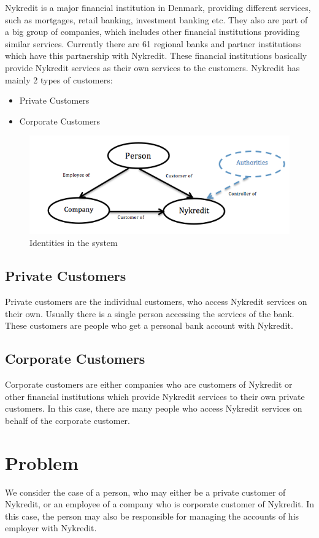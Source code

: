 Nykredit is a major financial institution in Denmark, providing different services, such as mortgages, retail banking, investment banking etc. They also are part of a big group of companies, which includes other financial institutions providing similar services. Currently there are 61 regional banks and partner institutions which have this partnership with Nykredit. These financial institutions basically provide Nykredit services as their own services to the customers.
Nykredit has mainly 2 types of customers:
\begin{itemize}
\item Private Customers
\item Corporate Customers
\end{itemize}
\begin{figure}[h]
	\centering
	\includegraphics[width=\textwidth]{figures/Customers}
	\caption{Identities in the system}
	\label{fig:Customers}
\end{figure}
\subsection{Private Customers}
Private customers are the individual customers, who access Nykredit services on their own. Usually there is a single person accessing the services of the bank. These customers are people who get a personal bank account with Nykredit.
\subsection{Corporate Customers}
Corporate customers are either companies who are customers of Nykredit or other financial institutions which provide Nykredit services to their own private customers. In this case, there are many people who access Nykredit services on behalf of the corporate customer.
\section{Problem}
We consider the case of a person, who may either be a private customer of Nykredit, or an employee of a company who is corporate customer of Nykredit. In this case, the person may also be responsible for managing the accounts of his employer with Nykredit.

